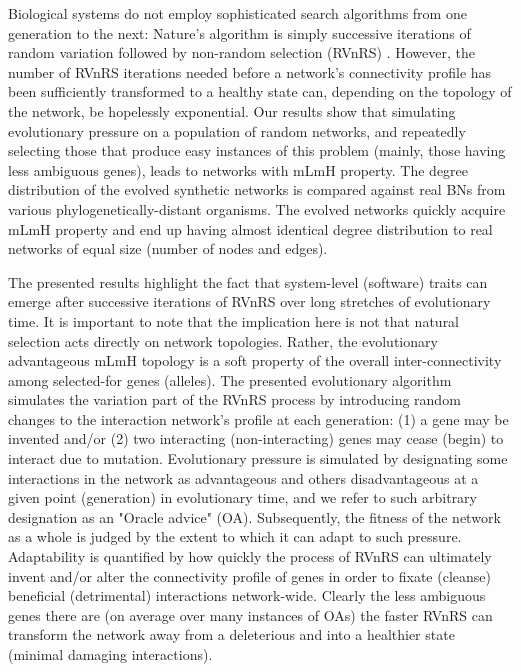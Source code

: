 Biological systems do not employ sophisticated search algorithms from one generation to the next: 
Nature's  algorithm is simply successive iterations of random variation followed by non-random selection (RVnRS) \cite{carvunis_proto-genes_2012}. However, 
the number of RVnRS iterations needed before a network's connectivity profile has been sufficiently transformed to a healthy state
can, depending on the topology of the network, be hopelessly exponential. 
Our results show that simulating evolutionary pressure on a population of random networks, and repeatedly selecting those
that produce easy instances of this problem (mainly, those having less ambiguous genes),  leads  to networks with mLmH property.
The degree distribution of the evolved synthetic networks is compared against real BNs from various phylogenetically-distant organisms. 
The evolved networks quickly acquire mLmH property and end up having almost identical degree distribution to real networks of equal size (number of nodes and edges). 

The presented results highlight the fact that system-level (software) traits can emerge after successive iterations of 
RVnRS over long stretches of evolutionary time. 
It is important to note that the implication here is not that natural selection acts directly
on network topologies. Rather, the
evolutionary advantageous mLmH topology is a soft property of the overall inter-connectivity among selected-for genes (alleles).
The presented evolutionary algorithm simulates the variation part of the RVnRS process by introducing random changes to the interaction network's profile
at each generation: (1) a gene may be invented  and/or (2) two interacting (non-interacting) genes may cease (begin) to interact due to mutation.
Evolutionary pressure is simulated by designating some interactions in the network as advantageous and others disadvantageous at a given point (generation) in evolutionary time, and 
we refer to such arbitrary designation as an "Oracle advice" (OA).
Subsequently, the fitness of the network as a whole is judged by the extent to which it can adapt to such pressure.
Adaptability is quantified by how quickly the process of RVnRS can ultimately 
invent and/or alter the connectivity profile of genes
in order to fixate (cleanse) beneficial (detrimental) interactions network-wide. Clearly the less ambiguous genes there are
(on average over many instances of OAs) the faster  RVnRS can transform the network away from a deleterious and into a healthier state (minimal damaging interactions). 

